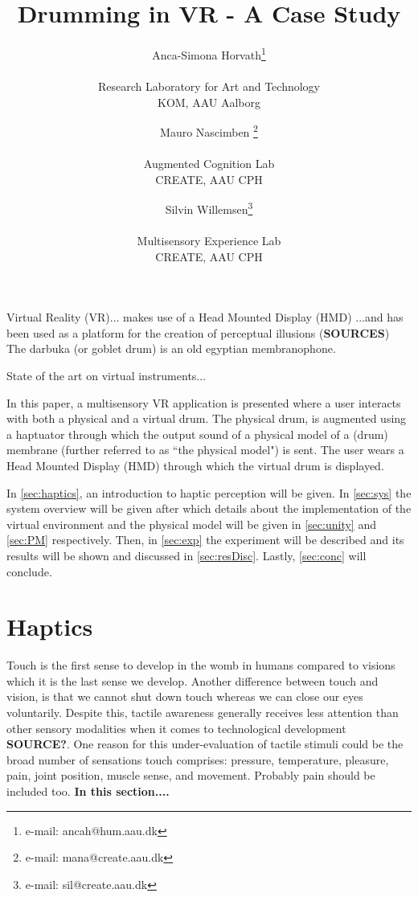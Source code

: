 \documentclass{vgtc}
\title{Drumming in VR - A Case Study}
\author{Anca-Simona Horvath\thanks{e-mail: ancah@hum.aau.dk}\\ %
        \parbox{1.4in}{\scriptsize \centering Research Laboratory for Art and Technology \\ KOM, AAU Aalborg} %
\and Mauro Nascimben \thanks{e-mail: mana@create.aau.dk}\\ %
     \parbox{1.4in}{\scriptsize \centering Augmented Cognition Lab \\ CREATE, AAU CPH }%
\and Silvin Willemsen\thanks{e-mail: sil@create.aau.dk}\\ %
     \parbox{1.4in}{\scriptsize \centering Multisensory Experience Lab \\ CREATE, AAU CPH}}
\begin{document}


\maketitle

Virtual Reality (VR)... makes use of a Head Mounted Display (HMD)
...and has been used as a platform for the creation of perceptual illusions (\textbf{SOURCES})
The darbuka (or goblet drum) is an old egyptian membranophone.

State of the art on virtual instruments...

In this paper, a multisensory VR application is presented where a user interacts with both a physical and a virtual drum. The physical drum, is augmented using a haptuator through which the output sound of a physical model of a (drum) membrane (further referred to as ``the physical model") is sent. The user wears a Head Mounted Display (HMD) through which the virtual drum is displayed. 

In \autoref{sec:haptics}, an introduction to haptic perception will be given. In \autoref{sec:sys} the system overview will be given after which details about the implementation of the virtual environment and the physical model will be given in \autoref{sec:unity} and \autoref{sec:PM} respectively. Then, in \autoref{sec:exp} the experiment will be described and its results will be shown and discussed in \autoref{sec:resDisc}. Lastly, \autoref{sec:conc} will conclude. 

\section{Haptics}\label{sec:haptics}
Touch is the first sense to develop in the womb in humans \cite{Barnett1972} compared to visions which it is the last sense we develop. Another difference between touch and vision, is that we cannot shut down touch whereas we can close our eyes voluntarily. Despite this, tactile awareness generally receives less attention than other sensory modalities when it comes to technological development \textbf{SOURCE?}. One reason for this under-evaluation of tactile stimuli could be the broad number of sensations touch comprises: pressure, temperature, pleasure, pain, joint position, muscle sense, and movement. Probably pain should be included too. \textbf{In this section.... }
\end{document}
